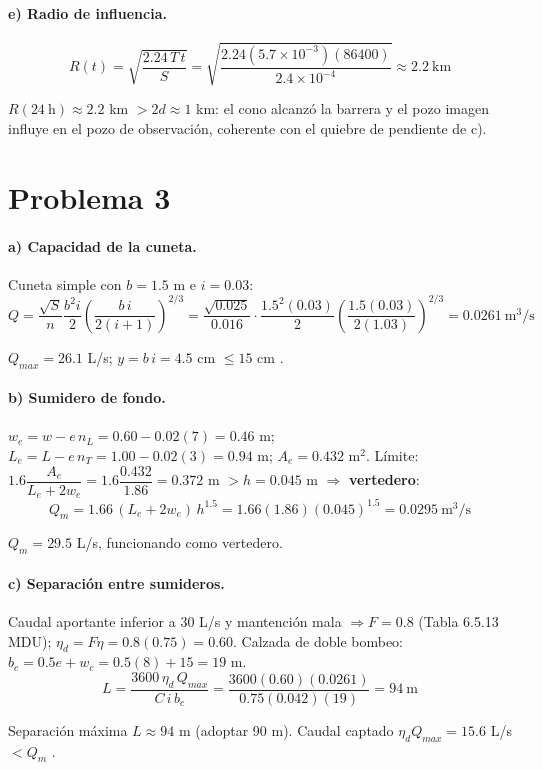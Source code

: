 \documentclass[11pt,letterpaper]{article}
\begin{document}
\paragraph{e) Radio de influencia.}
\[
R(t)=\sqrt{\frac{2.24\,T\,t}{S}}=\sqrt{\frac{2.24(5.7\times10^{-3})(86400)}{2.4\times10^{-4}}}\approx2.2\ \text{km}
\]
\begin{resp}$R(24\ \text{h})\approx2.2$ km $>2d\approx1$ km: el cono alcanzó la barrera y el pozo imagen influye en
el pozo de observación, coherente con el quiebre de pendiente de c).\end{resp}

\section*{Problema 3}

\paragraph{a) Capacidad de la cuneta.} Cuneta simple con $b=1.5$ m e $i=0.03$:
\[
Q=\frac{\sqrt S}{n}\frac{b^2 i}{2}\left(\frac{b\,i}{2(i+1)}\right)^{2/3}
=\frac{\sqrt{0.025}}{0.016}\cdot\frac{1.5^2(0.03)}{2}\left(\frac{1.5(0.03)}{2(1.03)}\right)^{2/3}=0.0261\ \text{m}^3/\text{s}
\]
\begin{resp}$Q_{max}=26.1$ L/s; $y=b\,i=4.5$ cm $\le15$ cm \checkmark.\end{resp}

\paragraph{b) Sumidero de fondo.}
$w_e=w-e\,n_L=0.60-0.02(7)=0.46$ m; $L_e=L-e\,n_T=1.00-0.02(3)=0.94$ m; $A_e=0.432$ m$^2$.
Límite: $1.6\dfrac{A_e}{L_e+2w_e}=1.6\dfrac{0.432}{1.86}=0.372$ m $>h=0.045$ m $\Rightarrow$ \textbf{vertedero}:
\[
Q_m=1.66\,(L_e+2w_e)\,h^{1.5}=1.66(1.86)(0.045)^{1.5}=0.0295\ \text{m}^3/\text{s}
\]
\begin{resp}$Q_m=29.5$ L/s, funcionando como vertedero.\end{resp}

\paragraph{c) Separación entre sumideros.} Caudal aportante inferior a 30 L/s y mantención mala
$\Rightarrow F=0.8$ (Tabla 6.5.13 MDU); $\eta_d=F\eta=0.8(0.75)=0.60$. Calzada de doble bombeo:
$b_c=0.5e+w_c=0.5(8)+15=19$ m.
\[
L=\frac{3600\,\eta_d\,Q_{max}}{C\,i\,b_c}=\frac{3600(0.60)(0.0261)}{0.75(0.042)(19)}=94\ \text{m}
\]
\begin{resp}Separación máxima $L\approx94$ m (adoptar 90 m). Caudal captado $\eta_dQ_{max}=15.6$ L/s $<Q_m$ \checkmark.\end{resp}
\end{document}
